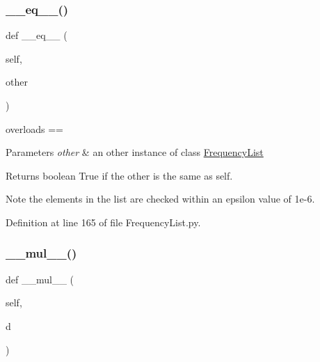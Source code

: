 \subsubsection{\texorpdfstring{\+\_\+\+\_\+eq\+\_\+\+\_\+()}{\_\_eq\_\_()}}
{\footnotesize\ttfamily def \+\_\+\+\_\+eq\+\_\+\+\_\+ (\begin{DoxyParamCaption}\item[{}]{self,  }\item[{}]{other }\end{DoxyParamCaption})}



overloads == 


\begin{DoxyParams}{Parameters}
{\em other} & an other instance of class \hyperlink{classSignalIntegrity_1_1FrequencyDomain_1_1FrequencyList_1_1FrequencyList}{Frequency\+List} \\
\hline
\end{DoxyParams}
\begin{DoxyReturn}{Returns}
boolean True if the other is the same as self. 
\end{DoxyReturn}
\begin{DoxyNote}{Note}
the elements in the list are checked within an epsilon value of 1e-\/6. 
\end{DoxyNote}


Definition at line 165 of file Frequency\+List.\+py.

\mbox{\label{classSignalIntegrity_1_1FrequencyDomain_1_1FrequencyList_1_1FrequencyList_a07c88d52e0963bb0c56e013184cd0d24}} 
\subsubsection{\texorpdfstring{\+\_\+\+\_\+mul\+\_\+\+\_\+()}{\_\_mul\_\_()}}
{\footnotesize\ttfamily def \+\_\+\+\_\+mul\+\_\+\+\_\+ (\begin{DoxyParamCaption}\item[{}]{self,  }\item[{}]{d }\end{DoxyParamCaption})}




